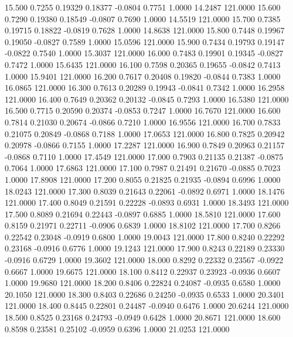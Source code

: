   15.500   0.7255   0.19329   0.18377  -0.0804   0.7751   1.0000  14.2487 121.0000
  15.600   0.7290   0.19380   0.18549  -0.0807   0.7690   1.0000  14.5519 121.0000
  15.700   0.7385   0.19715   0.18822  -0.0819   0.7628   1.0000  14.8638 121.0000
  15.800   0.7448   0.19967   0.19050  -0.0827   0.7589   1.0000  15.0596 121.0000
  15.900   0.7434   0.19793   0.19147  -0.0822   0.7540   1.0000  15.3037 121.0000
  16.000   0.7483   0.19901   0.19345  -0.0827   0.7472   1.0000  15.6435 121.0000
  16.100   0.7598   0.20365   0.19655  -0.0842   0.7413   1.0000  15.9401 121.0000
  16.200   0.7617   0.20408   0.19820  -0.0844   0.7383   1.0000  16.0865 121.0000
  16.300   0.7613   0.20289   0.19943  -0.0841   0.7342   1.0000  16.2958 121.0000
  16.400   0.7649   0.20362   0.20132  -0.0845   0.7293   1.0000  16.5380 121.0000
  16.500   0.7715   0.20590   0.20374  -0.0853   0.7247   1.0000  16.7670 121.0000
  16.600   0.7814   0.21030   0.20674  -0.0866   0.7210   1.0000  16.9556 121.0000
  16.700   0.7833   0.21075   0.20849  -0.0868   0.7188   1.0000  17.0653 121.0000
  16.800   0.7825   0.20942   0.20978  -0.0866   0.7155   1.0000  17.2287 121.0000
  16.900   0.7849   0.20963   0.21157  -0.0868   0.7110   1.0000  17.4549 121.0000
  17.000   0.7903   0.21135   0.21387  -0.0875   0.7064   1.0000  17.6863 121.0000
  17.100   0.7987   0.21491   0.21670  -0.0885   0.7023   1.0000  17.8908 121.0000
  17.200   0.8055   0.21825   0.21935  -0.0894   0.6996   1.0000  18.0243 121.0000
  17.300   0.8039   0.21643   0.22061  -0.0892   0.6971   1.0000  18.1476 121.0000
  17.400   0.8049   0.21591   0.22228  -0.0893   0.6931   1.0000  18.3493 121.0000
  17.500   0.8089   0.21694   0.22443  -0.0897   0.6885   1.0000  18.5810 121.0000
  17.600   0.8159   0.21971   0.22711  -0.0906   0.6839   1.0000  18.8102 121.0000
  17.700   0.8266   0.22542   0.23048  -0.0919   0.6800   1.0000  19.0043 121.0000
  17.800   0.8240   0.22292   0.23168  -0.0916   0.6776   1.0000  19.1243 121.0000
  17.900   0.8243   0.22189   0.23330  -0.0916   0.6729   1.0000  19.3602 121.0000
  18.000   0.8292   0.22332   0.23567  -0.0922   0.6667   1.0000  19.6675 121.0000
  18.100   0.8412   0.22937   0.23923  -0.0936   0.6607   1.0000  19.9680 121.0000
  18.200   0.8406   0.22824   0.24087  -0.0935   0.6580   1.0000  20.1050 121.0000
  18.300   0.8403   0.22686   0.24250  -0.0935   0.6533   1.0000  20.3401 121.0000
  18.400   0.8445   0.22801   0.24487  -0.0940   0.6476   1.0000  20.6244 121.0000
  18.500   0.8525   0.23168   0.24793  -0.0949   0.6428   1.0000  20.8671 121.0000
  18.600   0.8598   0.23581   0.25102  -0.0959   0.6396   1.0000  21.0253 121.0000
